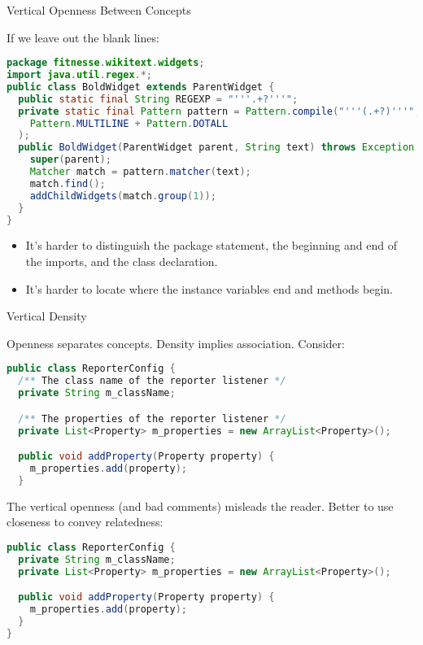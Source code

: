 \documentclass{beamer}
\begin{document}
\begin{frame}[fragile]{Vertical Openness Between Concepts}


If we leave out the blank lines:
\vspace{-.05in}
\begin{lstlisting}[language=Java]
package fitnesse.wikitext.widgets;
import java.util.regex.*;
public class BoldWidget extends ParentWidget {
  public static final String REGEXP = "'''.+?'''";
  private static final Pattern pattern = Pattern.compile("'''(.+?)'''",
    Pattern.MULTILINE + Pattern.DOTALL
  );
  public BoldWidget(ParentWidget parent, String text) throws Exception { 
    super(parent);
    Matcher match = pattern.matcher(text);
    match.find();
    addChildWidgets(match.group(1));
  }
}
\end{lstlisting}
\vspace{-.05in}
\begin{itemize}
\item It's harder to distinguish the package statement, the beginning and end of the imports, and the class declaration.
\item It's harder to locate where the instance variables end and methods begin.
\end{itemize}

\end{frame}

\begin{frame}[fragile]{Vertical Density}

\vspace{-.05in}
Openness separates concepts. Density implies association. Consider:
\vspace{-.25in}
\begin{lstlisting}[language=Java]
public class ReporterConfig {
  /** The class name of the reporter listener */
  private String m_className;

  /** The properties of the reporter listener */
  private List<Property> m_properties = new ArrayList<Property>();

  public void addProperty(Property property) {
    m_properties.add(property);
  }
\end{lstlisting}
\vspace{-.05in}
The vertical openness (and bad comments) misleads the reader.  Better to use closeness to convey relatedness:
\vspace{-.05in}
\begin{lstlisting}[language=Java]
public class ReporterConfig {
  private String m_className;
  private List<Property> m_properties = new ArrayList<Property>();

  public void addProperty(Property property) {
    m_properties.add(property);
  }
}
\end{lstlisting}

\end{frame}
\end{document}
